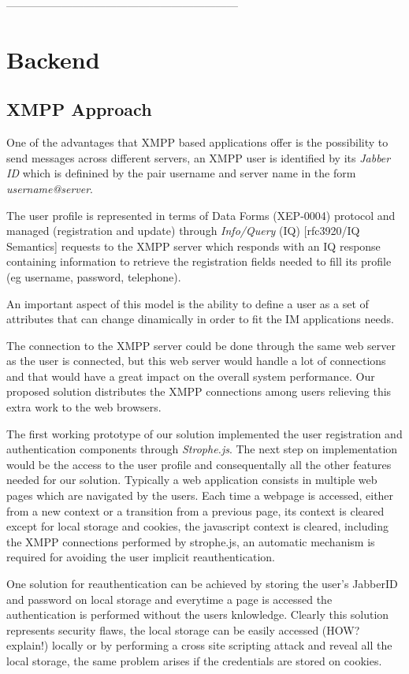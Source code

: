 ---------------------------------------------------------------

\section{Backend}

\subsection{XMPP Approach}

One of the advantages that XMPP based applications offer is the possibility to send messages across different servers, an XMPP user is identified by its \textit{Jabber ID} which is definined by the pair username and server name in the form \textit{username@server}.

The user profile is represented in terms of Data Forms (XEP-0004) protocol and managed (registration and update) through \textit{Info/Query} (IQ) [rfc3920/IQ Semantics] requests to the XMPP server which responds with an IQ response containing information to retrieve the registration fields needed to fill its profile (eg username, password, telephone). 

An important aspect of this model is the ability to define a user as a set of attributes that can change dinamically in order to fit the IM applications needs. 

The connection to the XMPP server could be done through the same web server as the user is connected, but this web server would handle a lot of connections and that would have a great impact on the overall system performance. Our proposed solution distributes the XMPP connections among users relieving this extra work to the web browsers.

The first working prototype of our solution implemented the user registration and authentication components through \textit{Strophe.js}. The next step on implementation would be the access to the user profile and consequentally all the other features needed for our solution. Typically a web application consists in multiple web pages which are navigated by the users. Each time a webpage is accessed, either from a new context or a transition from a previous page, its context is cleared except for local storage and cookies, the javascript context is cleared, including the XMPP connections performed by strophe.js, an automatic mechanism is required for avoiding the user implicit reauthentication.

One solution for reauthentication can be achieved by storing the user's JabberID and password on local storage and everytime a page is accessed the authentication is performed without the users knlowledge. Clearly this solution represents security flaws, the local storage can be easily accessed (HOW? explain!) locally or by performing a cross site scripting attack and reveal all the local storage, the same problem arises if the credentials are stored on cookies.

